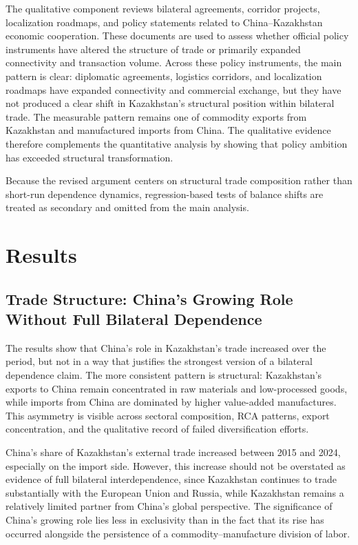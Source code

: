 \documentclass[12pt]{article}
\begin{document}
The qualitative component reviews bilateral agreements, corridor projects, localization roadmaps, and policy statements related to China--Kazakhstan economic cooperation. These documents are used to assess whether official policy instruments have altered the structure of trade or primarily expanded connectivity and transaction volume. Across these policy instruments, the main pattern is clear: diplomatic agreements, logistics corridors, and localization roadmaps have expanded connectivity and commercial exchange, but they have not produced a clear shift in Kazakhstan's structural position within bilateral trade. The measurable pattern remains one of commodity exports from Kazakhstan and manufactured imports from China. The qualitative evidence therefore complements the quantitative analysis by showing that policy ambition has exceeded structural transformation.

Because the revised argument centers on structural trade composition rather than short-run dependence dynamics, regression-based tests of balance shifts are treated as secondary and omitted from the main analysis.

\section{Results}

\subsection{Trade Structure: China's Growing Role Without Full Bilateral Dependence}

The results show that China's role in Kazakhstan's trade increased over the period, but not in a way that justifies the strongest version of a bilateral dependence claim. The more consistent pattern is structural: Kazakhstan's exports to China remain concentrated in raw materials and low-processed goods, while imports from China are dominated by higher value-added manufactures. This asymmetry is visible across sectoral composition, RCA patterns, export concentration, and the qualitative record of failed diversification efforts.

China's share of Kazakhstan's external trade increased between 2015 and 2024, especially on the import side. However, this increase should not be overstated as evidence of full bilateral interdependence, since Kazakhstan continues to trade substantially with the European Union and Russia, while Kazakhstan remains a relatively limited partner from China's global perspective. The significance of China's growing role lies less in exclusivity than in the fact that its rise has occurred alongside the persistence of a commodity--manufacture division of labor.
\end{document}

